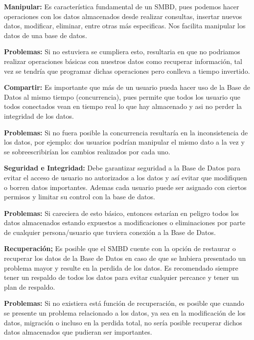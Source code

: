 \documentclass[12pt]{report}
\begin{document}
\begin{enumerate}[label=\textbf{\arabic*.}, leftmargin=*]
\begin{enumerate}[label=\textbf{\alph*.}, leftmargin=*, itemsep=1.0em]
\textbf{Manipular:}
Es característica fundamental de un SMBD, pues podemos hacer operaciones con los datos almacenados desde realizar consultas, insertar nuevos datos, modificar, eliminar, entre otras más especificas. Nos facilita manipular los datos de una base de datos.

\hspace{0.3cm}\textbf{Problemas:}
Si no estuviera se cumpliera esto, resultaria en que no podriamos realizar operaciones básicas con nuestros datos como recuperar información, tal vez se tendría que programar dichas operaciones pero conlleva a tiempo invertido.


\textbf{Compartir:}
Es importante que más de un usuario pueda hacer uso de la Base de Datos al mismo tiempo (concurrencia), pues permite que todos los usuario que todos conectados vean en tiempo real lo que hay almacenado y asi no perder la integridad de los datos.

\hspace{0.3cm}\textbf{Problemas:}
Si no fuera posible la concurrencia resultaría en la inconsistencia de los datos, por ejemplo: dos usuarios podrían manipular el mismo dato a la vez y se sobreescribirían los cambios realizados por cada uno.

\textbf{Seguridad e Integridad:}
Debe garantizar seguridad a la Base de Datos para evitar el acceso de usuario no autorizados a los datos y así evitar que modifiquen o borren datos importantes. Ademas cada usuario puede ser asignado con ciertos permisos y limitar su control con la base de datos.

\hspace{0.3cm}\textbf{Problemas:}
Si careciera de esto básico, entonces estarían en peligro todos los datos almacenados estando expuestos a modificaciones o eliminaciones por parte de cualquier persona/usuario que tuviera conexión a la Base de Datos.

\textbf{Recuperación;}
Es posible que el SMBD cuente con la opción de restaurar o recuperar los datos de la Base de Datos en caso de que se hubiera presentado un problema mayor y resulte en la perdida de los datos. Es recomendado siempre tener un respaldo de todos los datos para evitar cualquier percance y tener un plan de respaldo.

\hspace{0.3cm}\textbf{Problemas:}
Si no existiera está función de recuperación, es posible que cuando se presente un problema relacionado a los datos, ya sea en la modificación de los datos, migración o incluso en la perdida total, no sería posible recuperar dichos datos almacenados que pudieran ser importantes.



\end{enumerate}
\end{enumerate}
\end{document}

